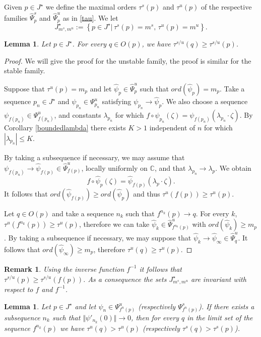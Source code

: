 \documentclass[10pt,a4paper]{article}
\newtheorem{lemma}[theorem]{Lemma}
\newtheorem{remark}[theorem]{Remark}
\begin{document}
Given $p\in J^\star$ we define the maximal orders $\tau^s(p)$ and $\tau^u(p)$ of the respective families $\widehat\Psi_p^s$ and $\widehat\Psi_p^u$ as in \eqref{tau}. We let
\[
J^\star_{m^s,m^u}:=\left\{p\in J^\star|\,\tau^s(p)=m^s,\,\tau^u(p)=m^u\right\}.
\]
\begin{lemma}
\label{tauincrease}
Let $p\in J^\star$. For every $q\in O(p)$, we have $\tau^{s/u}(q)\geq \tau^{s/u}(p)$.
\end{lemma}
\begin{proof}
We will give the proof for the unstable family, the proof is similar for the stable family.

Suppose that $\tau^u(p)=m_p$ and let $\widehat\psi_p\in\widehat\Psi^u_p$ such that $ord(\widehat\psi_p)=m_p$. Take a sequence $p_n\in J^\star$ and $\psi_{p_n}\in\Psi^u_{p_n}$ satisfying $\psi_{p_n}\to \widehat\psi_p$. We also choose a sequence $\psi_{f(p_n)}\in\Psi^u_{f(p_n)}$, and constants  $\lambda_{p_n}$ for which $f\circ\psi_{p_n}(\zeta)=\psi_{f(p_n)}(\lambda_{p_n} \cdot \zeta)$. By Corollary \ref{boundedlambda} there exists $K>1$ independent of $n$ for which $|\lambda_{p_n}|\leq K$.

By taking a subsequence if necessary, we may assume that $\psi_{f(p_n)}\to\widehat\psi_{f(p)}\in\widehat\Psi^u_{f(p)}$, locally uniformly on $\mathbb C$, and that $\lambda_{p_n}\to\lambda_p$. We obtain
\[
f\circ\widehat\psi_p(\zeta)=\widehat\psi_{f(p)}(\lambda_p \cdot \zeta).
\]
It follows that $ord(\widehat\psi_{f(p)})\geq ord(\widehat\psi_p)$ and thus $\tau^u(f(p))\geq \tau^u(p)$.

Let $q\in O(p)$ and take a sequence $n_k$ such that $f^{n_k}(p)\to q$. For every $k$, $\tau^u(f^{n_k}(p))\geq\tau^u(p)$, therefore we can take $\widehat\psi_k\in\widehat\Psi^u_{f^{n_k}(p)}$ with $ord(\widehat\psi_k)\geq m_p$. By taking a subsequence if necessary, we may suppose that $\widehat\psi_k\to\widehat\psi_\infty\in\widehat\Psi^u_q$. It follows that $ord(\widehat\psi_\infty)\geq m_p$, therefore $\tau^u(q)\geq\tau^u(p)$.
\end{proof}
\begin{remark}
Using the inverse function $f^{-1}$ it follows that $\tau^{s/u}(p)\geq\tau^{s/u}(f(p))$. As a consequence the sets $J^\star_{m^s,m^u}$ are invariant with respect to $f$ and $f^{-1}$.
\end{remark}
\begin{lemma}
\label{taustrictincrease}
Let $p\in J^\star$ and let $\psi_n\in\Psi^{u}_{f^n(p)}$ (respectively $\Psi^s_{f^n(p)}$). If there exists a subsequence $n_k$ such that $\Vert\psi'_{n_k}(0)\Vert\to 0$, then for every $q$ in the limit set of the sequence $f^{n_k}(p)$ we have $\tau^{u}(q)>\tau^{u}(p)$ (respectively $\tau^{s}(q)>\tau^{s}(p)$).
\end{lemma}
\end{document}
